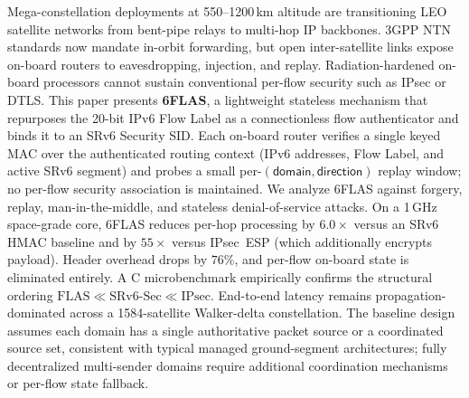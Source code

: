 Mega-constellation deployments at 550--1200\,km altitude are transitioning LEO
satellite networks from bent-pipe relays to multi-hop IP backbones. 3GPP
NTN standards now mandate in-orbit forwarding, but open inter-satellite links expose
on-board routers to eavesdropping, injection, and replay. Radiation-hardened
on-board processors cannot sustain conventional per-flow security such as
IPsec or DTLS. This paper presents \textbf{6FLAS}, a lightweight stateless
mechanism that repurposes the 20-bit IPv6 Flow Label as a connectionless flow
authenticator and binds it to an SRv6 Security SID. Each on-board router
verifies a single keyed MAC over the authenticated routing context (IPv6 addresses, Flow Label, and active SRv6 segment) and probes a small
per-$(\textsf{domain}, \textsf{direction})$ replay window; no per-flow security association is maintained.
We analyze 6FLAS against forgery, replay, man-in-the-middle, and stateless
denial-of-service attacks. On a 1\,GHz space-grade core, 6FLAS reduces per-hop
processing by $6.0\times$ versus an SRv6 HMAC
baseline and by $55\times$ versus IPsec~ESP (which additionally encrypts payload). Header overhead drops by $76\%$, and per-flow on-board state
is eliminated entirely. A C microbenchmark empirically confirms the structural ordering
$\text{FLAS} \ll \text{SRv6-Sec} \ll \text{IPsec}$. End-to-end latency remains
propagation-dominated across a 1584-satellite Walker-delta constellation. The baseline design assumes each domain has a single authoritative packet source or a coordinated source set, consistent with typical managed ground-segment architectures; fully decentralized multi-sender domains require additional coordination mechanisms or per-flow state fallback.
